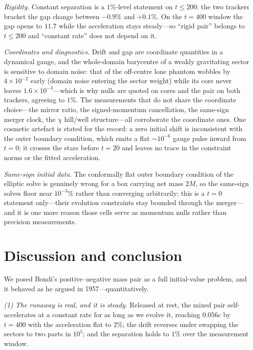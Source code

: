 \documentclass[twocolumn,floatfix,aps,prd,nofootinbib]{revtex4-2}
\begin{document}
\emph{Rigidity.} Constant separation is a $1\%$-level statement on $t\le200$: the two trackers bracket the gap change between $-0.9\%$ and $+0.1\%$. On the $t=400$ window the gap opens to $11.7$ while the acceleration stays steady---so ``rigid pair'' belongs to $t\le200$ and ``constant rate'' does not depend on it.

\emph{Coordinates and diagnostics.} Drift and gap are coordinate quantities in a dynamical gauge, and the whole-domain barycentre of a weakly gravitating sector is sensitive to domain noise: that of the off-centre lone phantom wobbles by $4\times10^{-2}$ early (domain noise entering the sector weight) while its core never leaves $1.6\times10^{-3}$---which is why nulls are quoted on cores and the pair on both trackers, agreeing to $1\%$. The measurements that do not share the coordinate choice---the mirror ratio, the signed-momentum cancellation, the same-sign merger clock, the $\chi$ hill/well structure---all corroborate the coordinate ones. One cosmetic artefact is stated for the record: a zero initial shift is inconsistent with the outer boundary condition, which emits a flat ${\sim}10^{-6}$ gauge pulse inward from $t=0$; it crosses the stars before $t=20$ and leaves no trace in the constraint norms or the fitted acceleration.

\emph{Same-sign initial data.} The conformally flat outer boundary condition of the elliptic solve is genuinely wrong for a box carrying net mass $2M$, so the same-sign solves floor near $10^{-3}\%$ rather than converging arbitrarily; this is a $t=0$ statement only---their evolution constraints stay bounded through the merger---and it is one more reason those cells serve as momentum nulls rather than precision measurements.

\section{Discussion and conclusion}
\label{sec:discussion}

We posed Bondi's positive--negative mass pair as a full initial-value problem, and it behaved as he argued in 1957---quantitatively.

\emph{(1) The runaway is real, and it is steady.} Released at rest, the mixed pair self-accelerates at a constant rate for as long as we evolve it, reaching $0.056c$ by $t=400$ with the acceleration flat to $2\%$; the drift reverses under swapping the sectors to two parts in $10^5$; and the separation holds to $1\%$ over the measurement window.
\end{document}
